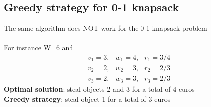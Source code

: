 \documentclass{article}[18pt]
\begin{document}
\subsection{Greedy strategy for 0-1 knapsack}
The same algorithm does NOT work for the 0-1 knapsack problem\\
\\
For instance W=6 and 
\[
\begin{array}{lll}{v_{1}=3,} & {w_{1}=4,} & {r_{1}=3 / 4} \\ {v_{2}=2,} & {w_{2}=3,} & {r_{2}=2 / 3} \\ {v_{3}=2,} & {w_{3}=3,} & {r_{3}=2 / 3}\end{array}
\]
\textbf{Optimal solution}: steal objects 2 and 3 for a total of 4 euros\\
\textbf{Greedy strategy}: steal object 1 for a total of 3 euros
\end{document}
